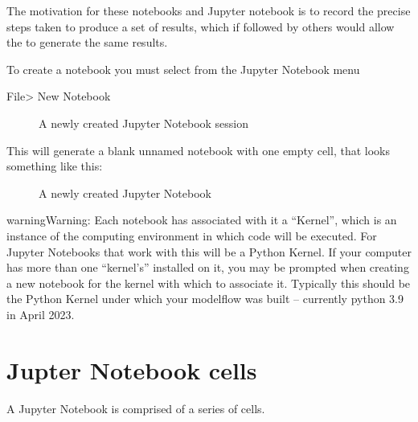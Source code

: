 \documentclass[letterpaper,10pt,english]{jupyterBook}
\let\sphinxpxdimen\pdfpxdimen\else\newdimen\sphinxpxdimen
\begin{document}
\sphinxAtStartPar
The motivation for these notebooks and Jupyter notebook is to record the precise steps taken to produce a set of results, which if followed by others would allow the to generate the same results.

\sphinxAtStartPar
To create a notebook you must select from the Jupyter Notebook menu

\sphinxAtStartPar
File\sphinxhyphen{}> New Notebook

\begin{figure}[htbp]
\centering
\capstart

\noindent\sphinxincludegraphics[height=150\sphinxpxdimen]{{NewNotebook}.png}
\caption{A newly created Jupyter Notebook session}\label{\detokenize{content/04_PythonEssentials/Intro_Jupyter_notebook:new-notebook}}\end{figure}

\sphinxAtStartPar
This will generate a blank unnamed notebook with one empty cell, that looks something like this:

\sphinxAtStartPar
{}

\begin{figure}[htbp]
\centering
\capstart

\noindent\sphinxincludegraphics[height=150\sphinxpxdimen]{{Newcell}.png}
\caption{A newly created Jupyter Notebook}\label{\detokenize{content/04_PythonEssentials/Intro_Jupyter_notebook:id1}}\end{figure}

\begin{sphinxadmonition}{warning}{Warning:}
\sphinxAtStartPar
Each notebook has associated with it a “Kernel”, which is an instance of the computing environment in which code will be executed. For Jupyter Notebooks that work with  this will be a Python Kernel. If your computer has more than one “kernel’s” installed on it, you may be prompted when creating a new notebook for the kernel with which to associate it.  Typically this should be the Python Kernel under which your modelflow was built – currently python 3.9 in April 2023.
\end{sphinxadmonition}


\section{Jupter Notebook cells}
\label{\detokenize{content/04_PythonEssentials/Intro_Jupyter_notebook:jupter-notebook-cells}}
\sphinxAtStartPar
A Jupyter Notebook is comprised of a series of cells.
\end{document}
